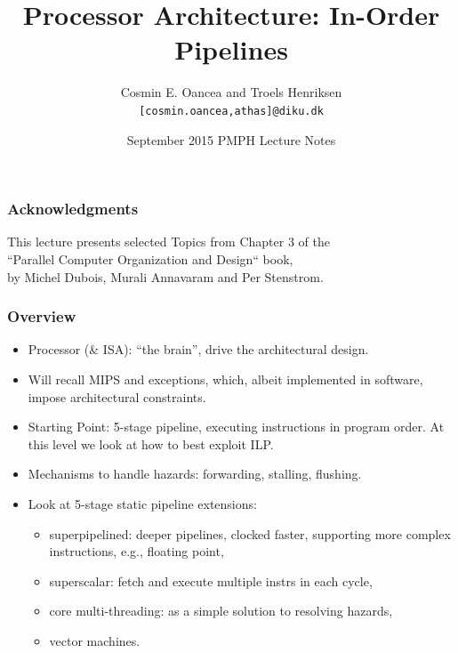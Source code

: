 \documentclass{beamer}
\title[Processor]{Processor Architecture: In-Order Pipelines}
\author[C.~Oancea]{Cosmin E. Oancea and Troels Henriksen\\{\tt [cosmin.oancea,athas]@diku.dk}}
\institute{Department of Computer Science (DIKU)\\University of Copenhagen}
\date[Sept 2015]{September 2015 PMPH Lecture Notes}
\begin{document}
\titleslide




\begin{frame}
\frametitle{Acknowledgments}
This lecture presents selected Topics from Chapter 3 of the\\
``Parallel Computer Organization and Design`` book,\\
by Michel Dubois, Murali Annavaram and Per Stenstrom.
\end{frame}

\begin{frame}[fragile,t]
\frametitle{Overview}

\begin{itemize}
    \item Processor (\& ISA): ``the brain'', drive the architectural design.\smallskip
 
    \item Will recall MIPS and exceptions, which, albeit implemented in software, 
            impose architectural constraints.\smallskip
    \item Starting Point: 5-stage pipeline, executing instructions in 
            program order. At this level we look at how to best exploit ILP.\smallskip
    \item Mechanisms to handle hazards: forwarding, stalling, flushing.\smallskip
    \item Look at 5-stage static pipeline extensions:
        \begin{itemize}
            \item superpipelined: deeper pipelines, clocked faster, supporting
                    more complex instructions, e.g., floating point,
            \item superscalar: fetch and execute multiple instrs in each cycle,
            \item core multi-threading: as a simple solution to resolving hazards,
            \item vector machines.
        \end  {itemize}
\end  {itemize}

\end{frame}
\end{document}

